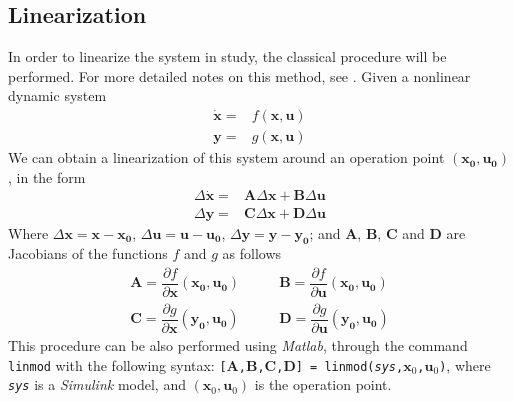 \subsection{Linearization}
In order to linearize the system in study, the classical procedure will be performed. For more detailed notes on this method, see \cite[pp. 21-27]{antsaklis2007linear}. Given a nonlinear dynamic system
\begin{equation}
\begin{split}
    \mathbf{\dot{x}} =& f(\mathbf{x},\mathbf{u})\\
    \mathbf{y}=&g(\mathbf{x},\mathbf{u})
\end{split}
\end{equation}
We can obtain a linearization of this system around an operation point $(\mathbf{x_0},\mathbf{u_0})$, in the form
\begin{equation}\label{eq:stateLinear}
\begin{split}
    \Delta\mathbf{\dot{x}} =& \mathbf{A} \Delta\mathbf{x}+\mathbf{B}\Delta\mathbf{u}\\
    \Delta\mathbf{y}=&\mathbf{C}\Delta\mathbf{x}+\mathbf{D}\Delta\mathbf{u}
\end{split}
\end{equation}
Where $\Delta \mathbf{x}=\mathbf{x}-\mathbf{x_0}$, $\Delta \mathbf{u}=\mathbf{u}-\mathbf{u_0}$, $\Delta \mathbf{y}=\mathbf{y}-\mathbf{y_0}$; and $\mathbf{A}$, $\mathbf{B}$, $\mathbf{C}$ and $\mathbf{D}$ are Jacobians of the functions $f$ and $g$ as follows
\begin{equation}
\begin{split}
    \mathbf{A}=\dfrac{\partial f}{\partial\mathbf{x}}(\mathbf{x_0},\mathbf{u_0})&\qquad \mathbf{B}=\dfrac{\partial f}{\partial\mathbf{u}}(\mathbf{x_0},\mathbf{u_0})\\
    \mathbf{C}=\dfrac{\partial g}{\partial\mathbf{x}}(\mathbf{y_0},\mathbf{u_0})&\qquad \mathbf{D}=\dfrac{\partial g}{\partial\mathbf{u}}(\mathbf{y_0},\mathbf{u_0})
\end{split}
\end{equation}
This procedure can be also performed using \textit{Matlab}, through the command \texttt{linmod} with the following syntax: \texttt{[$\mathbf{A}$,$\mathbf{B}$,$\mathbf{C}$,$\mathbf{D}$] = linmod(\textit{sys},$\mathbf{x}_0$,$\mathbf{u}_0$)}, where \texttt{\textit{sys}} is a \textit{Simulink} model, and $(\mathbf{x}_0,\mathbf{u}_0)$ is the operation point.

